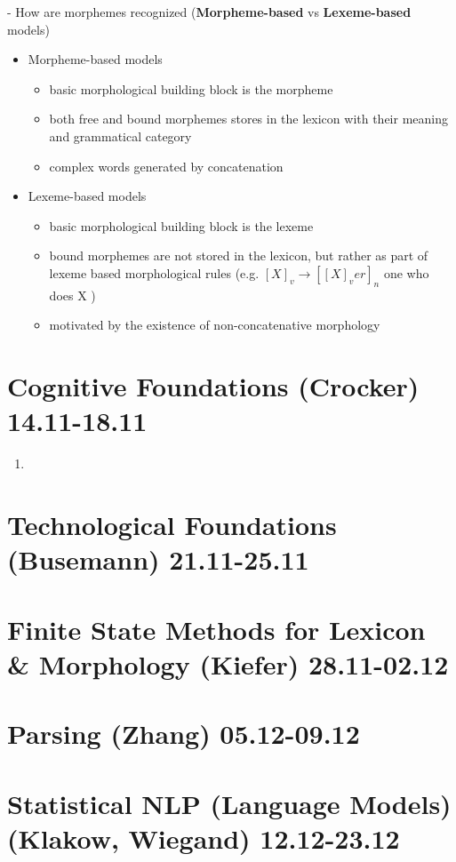 \documentclass[11pt]{article}
\begin{document}
- How are morphemes recognized ({\bf Morpheme-based} vs {\bf Lexeme-based} models)
\begin{itemize}
 \item Morpheme-based models
  \begin{itemize}
   \item basic morphological building block is the morpheme
   \item both free and bound morphemes stores in the lexicon with their meaning and grammatical category
   \item complex words generated by concatenation
  \end{itemize}
 \item Lexeme-based models
  \begin{itemize}
   \item basic morphological building block is the lexeme
   \item bound morphemes are not stored in the lexicon, but rather as part of lexeme based morphological rules (e.g. $[X]_v \rightarrow [[X]_v er]_n$ one who does X ) 
   \item motivated by the existence of non-concatenative morphology
  \end{itemize}
\end{itemize}


\section{ Cognitive Foundations (Crocker) 14.11-18.11}

\begin{enumerate}
 \item
\end{enumerate}


\section{Technological Foundations (Busemann) 21.11-25.11}

\section{Finite State Methods for Lexicon \& Morphology (Kiefer) 28.11-02.12}

\section{Parsing (Zhang) 05.12-09.12}

\section{Statistical NLP (Language Models) (Klakow, Wiegand) 12.12-23.12}
\end{document}

